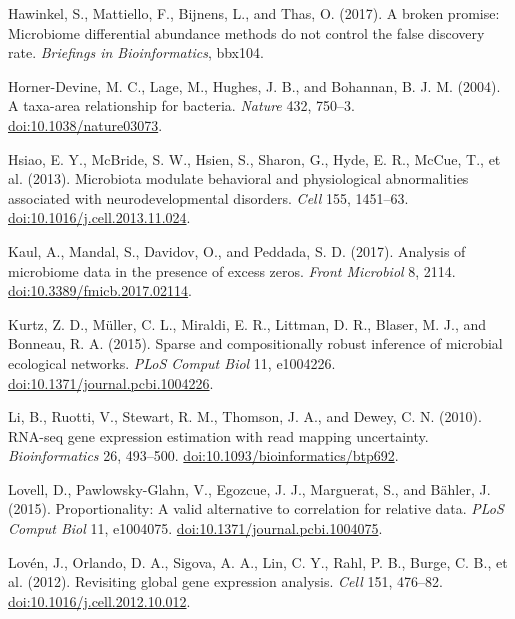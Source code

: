 \documentclass[twocolumn]{article}
\begin{document}
Hawinkel, S., Mattiello, F., Bijnens, L., and Thas, O. (2017). A broken
promise: Microbiome differential abundance methods do not control the
false discovery rate. \emph{Briefings in Bioinformatics}, bbx104.

Horner-Devine, M. C., Lage, M., Hughes, J. B., and Bohannan, B. J. M.
(2004). A taxa-area relationship for bacteria. \emph{Nature} 432,
750--3.
\href{http://doi.org/10.1038/nature03073}{doi:10.1038/nature03073}.

Hsiao, E. Y., McBride, S. W., Hsien, S., Sharon, G., Hyde, E. R., McCue,
T., et al. (2013). Microbiota modulate behavioral and physiological
abnormalities associated with neurodevelopmental disorders. \emph{Cell}
155, 1451--63.
\href{http://doi.org/10.1016/j.cell.2013.11.024}{doi:10.1016/j.cell.2013.11.024}.

Kaul, A., Mandal, S., Davidov, O., and Peddada, S. D. (2017). Analysis
of microbiome data in the presence of excess zeros. \emph{Front
Microbiol} 8, 2114.
\href{http://doi.org/10.3389/fmicb.2017.02114}{doi:10.3389/fmicb.2017.02114}.

Kurtz, Z. D., Müller, C. L., Miraldi, E. R., Littman, D. R., Blaser, M.
J., and Bonneau, R. A. (2015). Sparse and compositionally robust
inference of microbial ecological networks. \emph{PLoS Comput Biol} 11,
e1004226.
\href{http://doi.org/10.1371/journal.pcbi.1004226}{doi:10.1371/journal.pcbi.1004226}.

Li, B., Ruotti, V., Stewart, R. M., Thomson, J. A., and Dewey, C. N.
(2010). RNA-seq gene expression estimation with read mapping
uncertainty. \emph{Bioinformatics} 26, 493--500.
\href{http://doi.org/10.1093/bioinformatics/btp692}{doi:10.1093/bioinformatics/btp692}.

Lovell, D., Pawlowsky-Glahn, V., Egozcue, J. J., Marguerat, S., and
Bähler, J. (2015). Proportionality: A valid alternative to correlation
for relative data. \emph{PLoS Comput Biol} 11, e1004075.
\href{http://doi.org/10.1371/journal.pcbi.1004075}{doi:10.1371/journal.pcbi.1004075}.

Lovén, J., Orlando, D. A., Sigova, A. A., Lin, C. Y., Rahl, P. B.,
Burge, C. B., et al. (2012). Revisiting global gene expression analysis.
\emph{Cell} 151, 476--82.
\href{http://doi.org/10.1016/j.cell.2012.10.012}{doi:10.1016/j.cell.2012.10.012}.
\end{document}
